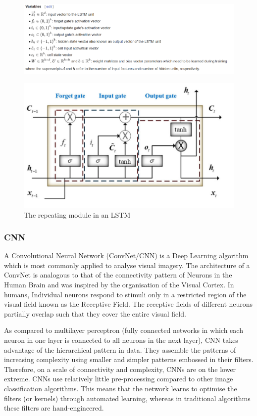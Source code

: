    \begin{figure}[h]
   	\centering
   	\includegraphics[width=1\linewidth]{images/vv.png}

   
   \end{figure}
   
   \begin{figure}[h]
   	\centering
   	\includegraphics[width=0.6\linewidth]{images/lstm.png}
   	\caption{The repeating module in an LSTM}
   	\label{l6}	
   \end{figure}
   
 
    \subsubsection{CNN}
    A Convolutional Neural Network (ConvNet/CNN) is a Deep Learning algorithm which is most commonly applied to analyse visual imagery. The architecture of a ConvNet is analogous to that of the connectivity pattern of Neurons in the Human Brain and was inspired by the organisation of the Visual Cortex. In humans, Individual neurons respond to stimuli only in a restricted region of the visual field known as the Receptive Field. The receptive fields of different neurons partially overlap such that they cover the entire visual field.
    
    As compared to multilayer perceptron (fully connected networks in which each neuron in one layer is connected to all neurons in the next layer), CNN takes advantage of the hierarchical pattern in data. They assemble the patterns of increasing complexity using smaller and simpler patterns embossed in their filters. Therefore, on a scale of connectivity and complexity, CNNs are on the lower extreme. CNNs use relatively little pre-processing compared to other image classification algorithms. This means that the network learns to optimise the filters (or kernels) through automated learning, whereas in traditional algorithms these filters are hand-engineered.
    
